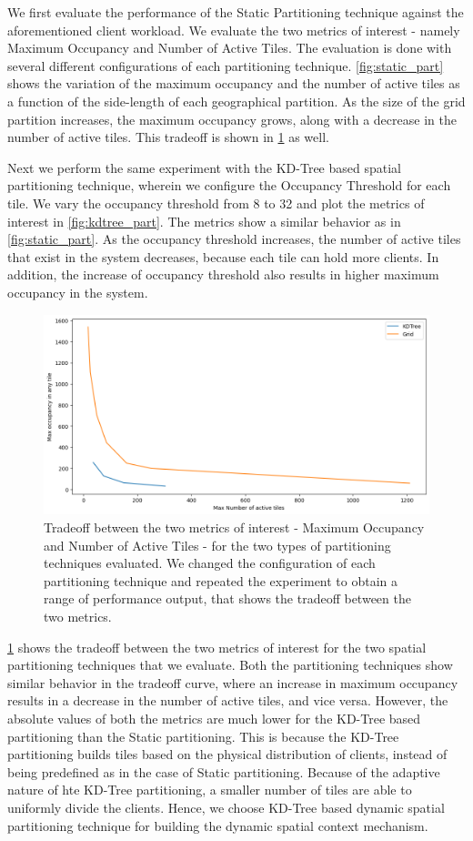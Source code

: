 We first evaluate the performance of the Static Partitioning technique against the aforementioned client workload. We evaluate the two metrics of interest - namely Maximum Occupancy and Number of Active Tiles. The evaluation is done with several different configurations of each partitioning technique. \cref{fig:static_part} shows the variation of the maximum occupancy and the number of active tiles as a function of the side-length of each geographical partition. As the size of the grid partition increases, the maximum occupancy grows, along with a decrease in the number of active tiles. This tradeoff is shown in \cref{fig:spatial_tradeoff} as well.
\par Next we perform the same experiment with the KD-Tree based spatial partitioning technique, wherein we configure the Occupancy Threshold for each tile. We vary the occupancy threshold from 8 to 32 and plot the metrics of interest in \cref{fig:kdtree_part}. The metrics show a similar behavior as in \cref{fig:static_part}. As the occupancy threshold increases, the number of active tiles that exist in the system decreases, because each tile can hold more clients. In addition, the increase of occupancy threshold also results in higher maximum occupancy in the system.

\begin{figure}
\centering
\includegraphics[width=0.75\linewidth]{figures/design_space/spatial/spatial_partitioning_tradeoff.png}
\caption{Tradeoff between the two metrics of interest - Maximum Occupancy and Number of Active Tiles - for the two types of partitioning techniques evaluated. We changed the configuration of each partitioning technique and repeated the experiment to obtain a range of performance output, that shows the tradeoff between the two metrics.}
\label{fig:spatial_tradeoff}
\end{figure}

\cref{fig:spatial_tradeoff} shows the tradeoff between the two metrics of interest for the two spatial partitioning techniques that we evaluate. Both the partitioning techniques show similar behavior in the tradeoff curve, where an increase in maximum occupancy results in a decrease in the number of active tiles, and vice versa. However, the absolute values of both the metrics are much lower for the KD-Tree based partitioning than the Static partitioning. This is because the KD-Tree partitioning builds tiles based on the physical distribution of clients, instead of being predefined as in the case of Static partitioning. Because of the adaptive nature of hte KD-Tree partitioning, a smaller number of tiles are able to uniformly divide the clients. Hence, we choose KD-Tree based dynamic spatial partitioning technique for building the dynamic spatial context mechanism.
